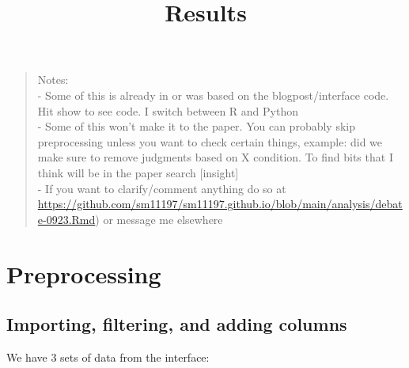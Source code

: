 \documentclass[
]{article}
\title{Results}
\author{}
\date{\vspace{-2.5em}}
\begin{document}
\maketitle

\begin{quote}
Notes:\\
- Some of this is already in or was based on the blogpost/interface
code. Hit show to see code. I switch between R and Python\\
- Some of this won't make it to the paper. You can probably skip
preprocessing unless you want to check certain things, example: did we
make sure to remove judgments based on X condition. To find bits that I
think will be in the paper search {[}insight{]}\\
- If you want to clarify/comment anything do so at
\url{https://github.com/sm11197/sm11197.github.io/blob/main/analysis/debate-0923.Rmd})
or message me elsewhere
\end{quote}

\hypertarget{preprocessing}{%
\section{Preprocessing}\label{preprocessing}}

\hypertarget{importing-filtering-and-adding-columns}{%
\subsection{Importing, filtering, and adding
columns}\label{importing-filtering-and-adding-columns}}

We have 3 sets of data from the interface:
\end{document}
